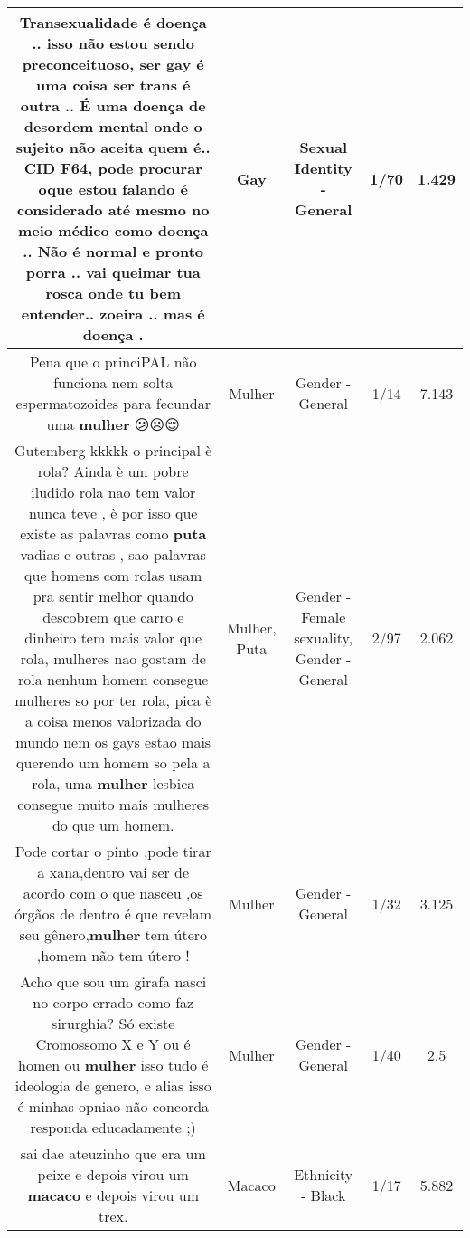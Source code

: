 \documentclass[11pt]{article}
\newlength\mylength
\begin{document}
\begin{center}
\begin{longtable}{|C{.65\mylength}|C{.30\mylength}|C{.12\mylength}|C{.12\mylength}|C{.12\mylength}|}
  \small Transexualidade é doença .. isso não estou sendo preconceituoso, ser \textbf{gay} é uma coisa ser trans é outra .. É uma doença de desordem mental onde o sujeito não aceita quem é..  CID F64, pode procurar oque estou falando é considerado até mesmo no meio médico como doença .. Não é normal e pronto porra .. vai queimar tua rosca onde tu bem entender.. zoeira .. mas é doença .\normalsize   & Gay & Sexual Identity - General & 1/70 & 1.429 \\  \hline
  \small Pena que o princiPAL não funciona nem solta espermatozoides para fecundar uma \textbf{mulher} 😕☹😌\normalsize   & Mulher & Gender - General & 1/14 & 7.143 \\  \hline
  \small {} Gutemberg kkkkk o principal è rola? Ainda è um pobre iludido rola nao tem valor nunca teve , è por isso que existe as palavras como \textbf{puta} vadias e outras , sao palavras que homens com rolas usam pra sentir melhor quando descobrem que carro e dinheiro tem mais valor que rola, mulheres nao gostam de rola nenhum homem consegue mulheres so por ter rola, pica è a coisa menos valorizada do mundo nem os gays estao mais querendo um homem so pela a rola, uma \textbf{mulher} lesbica consegue muito mais mulheres do que um homem.\normalsize   & Mulher, Puta & Gender - Female sexuality, Gender - General & 2/97 & 2.062 \\  \hline
  \small Pode cortar o pinto ,pode tirar a xana,dentro vai ser de acordo com o que nasceu ,os órgãos de dentro é que revelam seu gênero,\textbf{mulher} tem útero ,homem não tem útero !\normalsize   & Mulher & Gender - General & 1/32 & 3.125 \\  \hline
  \small Acho que sou um girafa nasci no corpo errado como faz sirurghia? Só existe Cromossomo X e Y ou é homen ou \textbf{mulher} isso tudo é ideologia de genero, e alias isso é minhas opniao não concorda responda educadamente ;)\normalsize   & Mulher & Gender - General & 1/40 & 2.5 \\  \hline
  \small sai dae ateuzinho que era um peixe e depois virou um \textbf{macaco} e depois virou um trex.\normalsize   & Macaco & Ethnicity - Black & 1/17 & 5.882 \\  \hline

\end{longtable}
\end{center}
\end{document}
